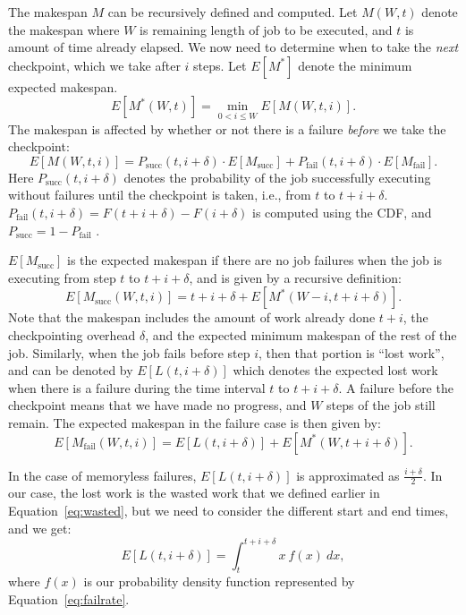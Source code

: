 The makespan $M$ can be recursively defined and computed.
Let $M(W, t)$ denote the makespan where $W$ is remaining length of job to be executed, and $t$ is amount of time already elapsed. %
We now need to determine when to take the \emph{next} checkpoint, which we take after $i$ steps. Let $E[M^*]$ denote the minimum expected makespan.
\begin{equation}
  \label{eq:m0}
  E[M^*(W, t)] = \min_{0<i\leq W}{E[M(W, t, i)]}.
\end{equation}
The makespan is affected by whether or not there is a failure \emph{before} we take the checkpoint: 
\begin{equation}
  \label{eq:m1}
E[M(W, t, i)] = P_{\text{succ}}(t, i+\delta) \cdot E[M_{\text{succ}}] + P_{\text{fail}}(t, i+\delta) \cdot E[M_{\text{fail}}].
\end{equation}
Here $P_{\text{succ}}(t, i+\delta)$ denotes the probability of the job successfully executing without failures until the checkpoint is taken, i.e., from $t$ to $t+i+\delta$. $P_{\text{fail}}(t, i+\delta) = F(t+i+\delta)-F(i+\delta)$ is computed using the CDF, 
and $P_{\text{succ}} = 1 - P_{\text{fail}}$ .


$E[M_{\text{succ}}]$ is the expected makespan if there are no job failures when the job is executing from step $t$ to $t+i+\delta$, and is given by a recursive definition:
\begin{equation}
  \label{eq:msuc}
E[M_{\text{succ}}(W, t, i)] = t+i+\delta + E[M^*(W-i, t+i+\delta)].  
\end{equation}
\noindent Note that the makespan includes the amount of work already done $t+i$, the checkpointing overhead $\delta$, and the expected minimum makespan of the rest of the job.
Similarly, when the job fails before step $i$, then that portion is ``lost work'', and can be denoted by $E[L(t, i+\delta)]$ which denotes the expected lost work when there is a failure during the time interval $t$ to $t+i+\delta$.
A failure before the checkpoint means that we have made no progress, and $W$ steps of the job still remain.
The expected makespan in the failure case is then given by:
\begin{equation}
  \label{eq:mfail}
 E[M_{\text{fail}}(W, t, i)] = E[L(t, i+\delta)] + E[M^*(W, t+i+\delta)].
\end{equation}



In the case of memoryless failures, $E[L(t, i+\delta)]$ is approximated as $\frac{i+\delta}{2}$.
In our case, the lost work is the wasted work that we defined earlier in Equation~\ref{eq:wasted}, but we need to consider the different start and end times, and we get:
\begin{equation}
  \label{eq:exploss}
E[L(t, i+\delta)] = \int_{t}^{t+i+\delta}{x~f(x)~dx}   , 
\end{equation}
where $f(x)$ is our probability density function represented by Equation~\ref{eq:failrate}.

